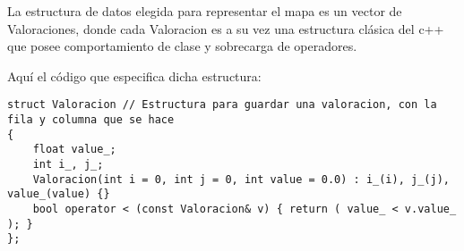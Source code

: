 La estructura de datos elegida para representar el mapa es un vector de Valoraciones,
donde cada Valoracion es a su vez una estructura clásica del c++ que posee comportamiento
de clase y sobrecarga de operadores.

Aquí el código que especifica dicha estructura:

\lstset{language=C++, texcl=true}
\begin{lstlisting}[frame=single]
struct Valoracion // Estructura para guardar una valoracion, con la fila y columna que se hace
{
    float value_;
    int i_, j_;
    Valoracion(int i = 0, int j = 0, int value = 0.0) : i_(i), j_(j), value_(value) {}
    bool operator < (const Valoracion& v) { return ( value_ < v.value_ ); }
};
\end{lstlisting}
